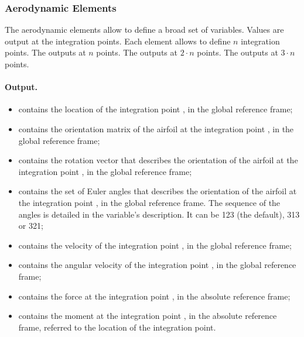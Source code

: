 \subsubsection{Aerodynamic Elements}
\label{sec:NetCDF:Elem:Aerodynamic}

The aerodynamic elements allow to define a broad set of variables.
Values are output at the integration points.
Each element allows to define $n$ integration points.
The  outputs at $n$ points.
The  outputs at $2 \cdot n$ points.
The  outputs at $3 \cdot n$ points.

\paragraph{Output.}
\begin{itemize}
\item {} contains the location
of the integration point , in the global reference frame;

\item {} contains the orientation matrix
of the airfoil at the integration point , in the global reference frame;

\item {} contains the rotation vector
that describes the orientation of the airfoil at the integration point ,
in the global reference frame;

\item {} contains the set of Euler angles
that describes the orientation of the airfoil at the integration point ,
in the global reference frame.
The sequence of the angles is detailed in the variable's description.
It can be 123 (the default), 313 or 321;

\item {} contains the velocity
of the integration point , in the global reference frame;

\item {} contains the angular velocity
of the integration point , in the global reference frame;

\item {} contains the force
at the integration point , in the absolute reference frame;

\item {} contains the moment
at the integration point , in the absolute reference frame,
referred to the location of the integration point.
\end{itemize}

